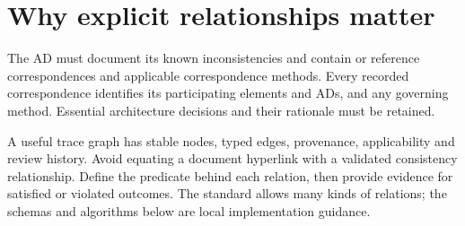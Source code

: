 \documentclass[11pt,letterpaper]{article}
\begin{document}
\InterpretationKey
\section{Why explicit relationships matter}
\begin{Requirement}\FlagReq{} The AD must document its known inconsistencies and contain or reference correspondences and applicable correspondence methods. Every recorded correspondence identifies its participating elements and ADs, and any governing method. Essential architecture decisions and their rationale must be retained. \end{Requirement}
\begin{Guidance}A useful trace graph has stable nodes, typed edges, provenance, applicability and review history. Avoid equating a document hyperlink with a validated consistency relationship. Define the predicate behind each relation, then provide evidence for satisfied or violated outcomes. The standard allows many kinds of relations; the schemas and algorithms below are local implementation guidance.\end{Guidance}
\end{document}
